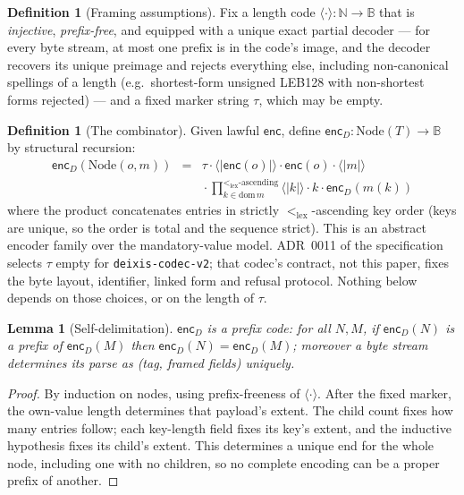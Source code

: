 \documentclass[11pt]{article}
\newtheorem{lemma}[theorem]{Lemma}
\theoremstyle{definition}
\newtheorem{definition}[theorem]{Definition}
\newcommand{\Bytes}{\mathbb{B}}                    %
\newcommand{\NodeT}[1]{\mathrm{Node}(#1)}
\newcommand{\dom}{\mathrm{dom}\,}
\newcommand{\lex}{<_{\mathrm{lex}}}
\newcommand{\enc}{\mathsf{enc}}
\newcommand{\encD}{\mathsf{enc}_{\!D}}
\begin{document}
\begin{definition}[Framing assumptions]\label{def:framing}
Fix a length code $\langle \cdot \rangle : \mathbb{N} \to \Bytes$ that is
\emph{injective}, \emph{prefix-free}, and equipped with a unique exact partial
decoder --- for every byte stream, at most one prefix is in the code's image, and the
decoder recovers its unique preimage and rejects everything else, including
non-canonical spellings of a length (e.g.\ shortest-form unsigned LEB128 with
non-shortest forms rejected) --- and a fixed marker string $\tau$, which may be empty.
\end{definition}

\begin{definition}[The combinator]\label{def:encd}
Given lawful $\enc$, define $\encD : \NodeT{T} \to \Bytes$ by structural recursion:
\[
\begin{array}{lcl}
\encD(\mathrm{Node}(o,m)) &=&
  \tau \cdot \langle |\enc(o)| \rangle \cdot \enc(o) \cdot \langle |m| \rangle\\[2pt]
&& {}\cdot
  \displaystyle\prod_{k \in \dom m}^{\lex\text{-ascending}}
  \langle |k| \rangle \cdot k \cdot \encD(m(k))
\end{array}
\]
where the product concatenates entries in strictly $\lex$-ascending key order (keys
are unique, so the order is total and the sequence strict). This is an abstract
encoder family over the mandatory-value model. ADR~0011 of the specification selects
$\tau$ empty for \texttt{deixis-codec-v2}; that codec's contract, not this paper, fixes
the byte layout, identifier, linked form and refusal protocol. Nothing below depends on
those choices, or on the length of $\tau$.
\end{definition}

\begin{lemma}[Self-delimitation]\label{lem:selfdelim}
$\encD$ is a prefix code: for all $N, M$, if $\encD(N)$ is a prefix of $\encD(M)$
then $\encD(N) = \encD(M)$; moreover a byte stream determines its parse as
(tag, framed fields) uniquely.
\end{lemma}

\begin{proof}
By induction on nodes, using prefix-freeness of $\langle\cdot\rangle$. After the
fixed marker, the own-value length determines that payload's extent. The child
count fixes how many entries follow; each key-length field fixes its key's extent,
and the inductive hypothesis fixes its child's extent. This determines a unique
end for the whole node, including one with no children, so no complete encoding
can be a proper prefix of another.
\end{proof}
\end{document}
